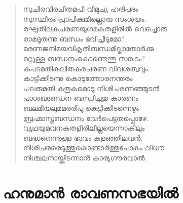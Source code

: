 \begin{verse}
സുചിരവിരചിതമപി വിമുച്യ ഹരിപദം\\
സുസ്ഥിരം പ്രാപിക്കുമില്ലൊരു സംശയം.\\
രഘുതിലകചരണയുഗമകതളിരില്‍ വെച്ചൊരു\\
രാമദൂതന്നു ബന്ധം ഭവിച്ചീടുമോ?\\
മരണജനിമയവികൃതിബന്ധമില്ലാതോര്‍ക്കു\\
മറ്റുള്ള ബന്ധനംകൊണ്ടെന്തു സങ്കടം?\\
കപടമതികലിതകരചരണ വിവശത്വവും\\
കാട്ടിക്കിടന്നു കൊടുത്തോരനന്തരം\\
പലരുമതി കുതുകമൊടു നിശിചരണഞ്ഞുടന്‍\\
പാശഖണ്ഡേന ബന്ധിച്ചതു കാരണം\\
ബലമിയലുമമരരിപു കെട്ടിക്കിടന്നെഴും\\
ബ്രഹ്മാസ്ത്രബന്ധനം വേര്‍പെട്ടതപ്പൊഴേ.\\
വ്യഥയുമവനകതളിരിലില്ലയെന്നാകിലും\\
ബദ്ധനെന്നുള്ള ഭാവം കളഞ്ഞീലവന്‍.\\
നിശിചരരെടുത്തുകൊണ്ടാര്‍ത്തുപോകും വിധൗ\\
നിശ്ചലനായ്ക്കിടന്നാന്‍ കാര്യഗൗരവാല്‍.
\end{verse}


\section{ഹനുമാന്‍ രാവണസഭയില്‍}

